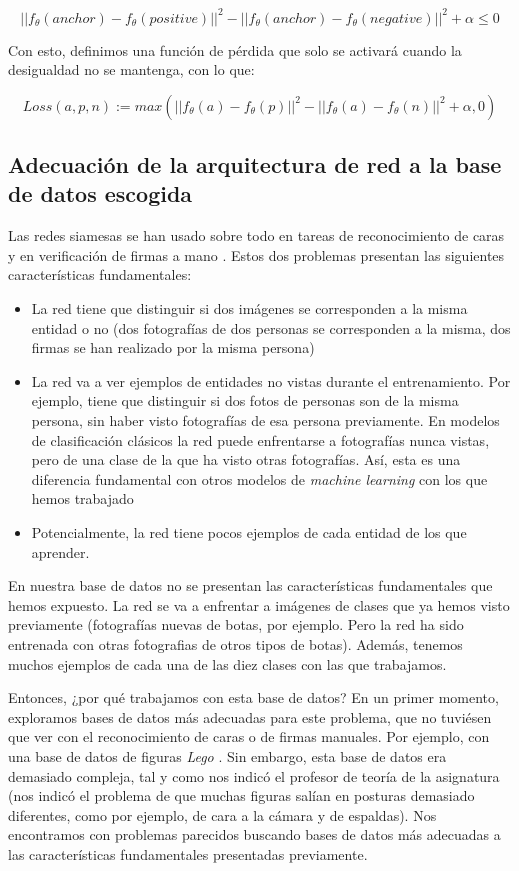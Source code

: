 \documentclass[11pt]{article}
\begin{document}
$$||f_{\theta}(anchor) - f_{\theta}(positive)||^2 - ||f_{\theta}(anchor) - f_{\theta}(negative)||^2 + \alpha \leq 0$$

Con esto, definimos una función de pérdida que solo se activará cuando la desigualdad no se mantenga, con lo que:

$$Loss(a, p, n) := max(||f_{\theta}(a) - f_{\theta}(p)||^2 - ||f_{\theta}(a) - f_{\theta}(n)||^2 + \alpha, 0)$$

\pagebreak
\subsection{Adecuación de la arquitectura de red a la base de datos escogida} \label{adecuacion_arquitectura_red:seccion}

Las redes siamesas se han usado sobre todo en tareas de reconocimiento de caras y en verificación de firmas a mano \cite{siamese_wikipedia:online}. Estos dos problemas presentan las siguientes características fundamentales:

\begin{itemize}
  \item La red tiene que distinguir si dos imágenes se corresponden a la misma entidad o no (dos fotografías de dos personas se corresponden a la misma, dos firmas se han realizado por la misma persona)
  \item La red va a ver ejemplos de entidades no vistas durante el entrenamiento. Por ejemplo, tiene que distinguir si dos fotos de personas son de la misma persona, sin haber visto fotografías de esa persona previamente. En modelos de clasificación clásicos la red puede enfrentarse a fotografías nunca vistas, pero de una clase de la que ha visto otras fotografías. Así, esta es una diferencia fundamental con otros modelos de \emph{machine learning} con los que hemos trabajado 
  \item Potencialmente, la red tiene pocos ejemplos de cada entidad de los que aprender. 
\end{itemize}

En nuestra base de datos no se presentan las características fundamentales que hemos expuesto. La red se va a enfrentar a imágenes de clases que ya hemos visto previamente (fotografías nuevas de botas, por ejemplo. Pero la red ha sido entrenada con otras fotografias de otros tipos de botas). Además, tenemos muchos ejemplos de cada una de las diez clases con las que trabajamos.

Entonces, ¿por qué trabajamos con esta base de datos? En un primer momento, exploramos bases de datos más adecuadas para este problema, que no tuviésen que ver con el reconocimiento de caras o de firmas manuales. Por ejemplo, con una base de datos de figuras \emph{Lego} \cite{lego_database:online}. Sin embargo, esta base de datos era demasiado compleja, tal y como nos indicó el profesor de teoría de la asignatura (nos indicó el problema de que muchas figuras salían en posturas demasiado diferentes, como por ejemplo, de cara a la cámara y de espaldas). Nos encontramos con problemas parecidos buscando bases de datos más adecuadas a las características fundamentales presentadas previamente.
\end{document}
